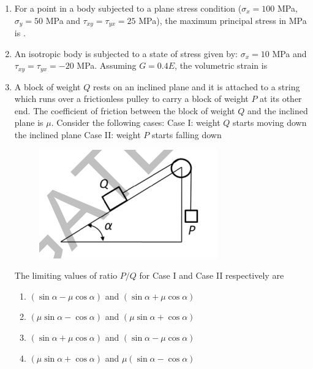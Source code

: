 \documentclass[a4paper,10pt]{article}
\begin{document}
\begin{enumerate}
    \item For a point in a body subjected to a plane stress condition ($\sigma_x = 100$ MPa, $\sigma_y = 50$ MPa and $\tau_{xy} = \tau_{yx} = 25$ MPa), the maximum principal stress in MPa is \underline{\hspace{2cm}}.
    
    \hfill{}
    
    \item An isotropic body is subjected to a state of stress given by: $\sigma_x = 10$ MPa and $\tau_{xy} = \tau_{yx} = -20$ MPa. Assuming $G=0.4E$, the volumetric strain is
    
    \hfill{}
    \begin{enumerate}[label=\Alph*)]
    \end{enumerate}
    
    \item A block of weight $Q$ rests on an inclined plane and it is attached to a string which runs over a frictionless pulley to carry a block of weight $P$ at its other end. The coefficient of friction between the block of weight $Q$ and the inclined plane is $\mu$. Consider the following cases:
    Case I: weight $Q$ starts moving down the inclined plane
    Case II: weight $P$ starts falling down
    \begin{figure}[H] \centering \includegraphics[width=0.4\columnwidth]{q19_solid.png} \caption*{} \label{fig:q19_solid} \end{figure}
    The limiting values of ratio $P/Q$ for Case I and Case II respectively are
    
    \hfill{}
    \begin{enumerate}[label=\Alph*)]
        \item $(\sin\alpha - \mu\cos\alpha)$ and $(\sin\alpha + \mu\cos\alpha)$
        \item $(\mu\sin\alpha - \cos\alpha)$ and $(\mu\sin\alpha + \cos\alpha)$
        \item $(\sin\alpha + \mu\cos\alpha)$ and $(\sin\alpha - \mu\cos\alpha)$
        \item $(\mu\sin\alpha + \cos\alpha)$ and $\mu(\sin\alpha - \cos\alpha)$
    \end{enumerate}
    

\end{enumerate}
\end{document}
